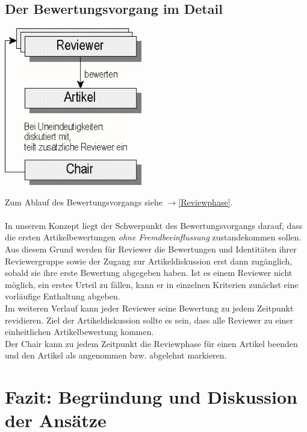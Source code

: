 \documentclass[headexclude,footexclude,12pt,BCOR0pt,DIV15]{scrartcl}
\begin{document}
    \subsection{Der Bewertungsvorgang im Detail}
        \begin{center}\includegraphics[width=6cm]{bewertung1}\end{center}
        Zum Ablauf des Bewertungsvorgangs siehe $\rightarrow$\ref{Reviewphase}.\\
        \\
        In unserem Konzept liegt der Schwerpunkt des Bewertungsvorgangs darauf, dass die ersten Artikelbewertungen
        \emph{ohne Fremdbeeinflussung} zustandekommen sollen. Aus diesem Grund werden f\"{u}r Reviewer die Bewertungen und Identit\"{a}ten
        ihrer Reviewergruppe sowie der Zugang zur Artikeldiskussion erst dann zug\"{a}nglich, sobald sie ihre erste Bewertung
        abgegeben haben. Ist es einem Reviewer nicht m\"{o}glich, ein erstes Urteil zu f\"{a}llen, kann er in einzelnen
        Kriterien zun\"{a}chst eine vorl\"{a}ufige Enthaltung abgeben.\\
        Im weiteren Verlauf kann jeder Reviewer seine Bewertung zu jedem Zeitpunkt revidieren.
        Ziel der Artikeldiskussion sollte es sein, dass alle Reviewer zu einer einheitlichen Artikelbewertung kommen.\\
        Der Chair kann zu jedem Zeitpunkt die Reviewphase f\"{u}r einen Artikel beenden und den Artikel als angenommen bzw.
        abgelehnt markieren.

\pagebreak
\section{Fazit: Begr\"{u}ndung und Diskussion der Ans\"{a}tze}
\end{document}
